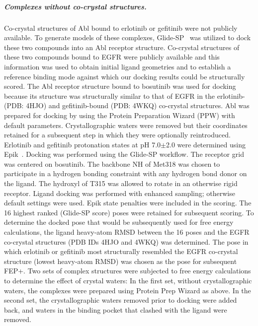 \documentclass[phd,tocprelim]{cornell}
\begin{document}
\subparagraph{Complexes without co-crystal structures.}
Co-crystal structures of Abl bound to erlotinib or gefitinib were not publicly available. To generate models of these complexes, Glide-SP~\citep{Friesner:J.Med.Chem.:2004} was utilized to dock these two compounds into an Abl receptor structure. 
Co-crystal structures of these two compounds bound to EGFR were publicly available and this information was used to obtain initial ligand geometries and to establish a reference binding mode against which our docking results could be structurally scored.    
The Abl receptor structure bound to bosutinib was used for docking because its structure was structurally similar to that of EGFR in the erlotinib- (PDB: 4HJO) \citep{Park:Biochem.J.:2012} and gefitinib-bound (PDB: 4WKQ) \citep{Yosaatmadja::2014} co-crystal structures. 
Abl was prepared for docking by using the Protein Preparation Wizard (PPW) with default parameters. 
Crystallographic waters were removed but their coordinates retained for a subsequent step in which they were optionally reintroduced. 
Erlotinib and gefitinib protonation states at pH 7.0$\pm$2.0 were determined using Epik~\citep{Shelley:J.Comput.AidedMol.Des.:2007}.
Docking was performed using the Glide-SP workflow. 
The receptor grid was centered on bosutinib. 
The backbone NH of Met318 was chosen to participate in a hydrogen bonding constraint with any hydrogen bond donor on the ligand. 
The hydroxyl of T315 was allowed to rotate in an otherwise rigid receptor. Ligand docking was performed with enhanced sampling; otherwise default settings were used. Epik state penalties were included in the scoring. The 16 highest ranked (Glide-SP score) poses were retained for subsequent scoring. 
To determine the docked pose that would be subsequently used for free energy calculations, the ligand heavy-atom RMSD between the 16 poses and the EGFR co-crystal structures (PDB IDs 4HJO and 4WKQ) was determined. 
The pose in which erlotinib or gefitinib most structurally resembled the EGFR co-crystal structure (lowest heavy-atom RMSD) was chosen as the pose for subsequent FEP+. 
Two sets of complex structures were subjected to free energy calculations to determine the effect of crystal waters: In the first set, without crystallographic waters, the complexes were prepared using Protein Prep Wizard as above. 
In the second set, the crystallographic waters removed prior to docking were added back, and waters in the binding pocket that clashed with the ligand were removed. 
\end{document}
